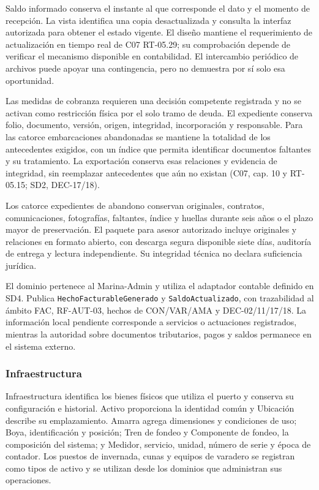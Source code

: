 Saldo informado conserva el instante al que corresponde el dato y el momento de recepción. La vista identifica una copia desactualizada y consulta la interfaz autorizada para obtener el estado vigente. El diseño mantiene el requerimiento de actualización en tiempo real de C07 RT-05.29; su comprobación depende de verificar el mecanismo disponible en contabilidad. El intercambio periódico de archivos puede apoyar una contingencia, pero no demuestra por sí solo esa oportunidad.

Las medidas de cobranza requieren una decisión competente registrada y no se activan como restricción física por el solo tramo de deuda. El expediente conserva folio, documento, versión, origen, integridad, incorporación y responsable. Para las catorce embarcaciones abandonadas se mantiene la totalidad de los antecedentes exigidos, con un índice que permita identificar documentos faltantes y su tratamiento. La exportación conserva esas relaciones y evidencia de integridad, sin reemplazar antecedentes que aún no existan (C07, cap. 10 y RT-05.15; SD2, DEC-17/18).

Los catorce expedientes de abandono conservan originales, contratos, comunicaciones, fotografías, faltantes, índice y huellas durante seis años o el plazo mayor de preservación. El paquete para asesor autorizado incluye originales y relaciones en formato abierto, con descarga segura disponible siete días, auditoría de entrega y lectura independiente. Su integridad técnica no declara suficiencia jurídica.

El dominio pertenece al Marina-Admin y utiliza el adaptador contable definido en SD4. Publica \texttt{HechoFacturableGenerado} y \texttt{SaldoActualizado}, con trazabilidad al ámbito FAC, RF-AUT-03, hechos de CON/VAR/AMA y DEC-02/11/17/18. La información local pendiente corresponde a servicios o actuaciones registrados, mientras la autoridad sobre documentos tributarios, pagos y saldos permanece en el sistema externo.


\subsubsection{Infraestructura}
Infraestructura identifica los bienes físicos que utiliza el puerto y conserva su configuración e historial. Activo proporciona la identidad común y Ubicación describe su emplazamiento. Amarra agrega dimensiones y condiciones de uso; Boya, identificación y posición; Tren de fondeo y Componente de fondeo, la composición del sistema; y Medidor, servicio, unidad, número de serie y época de contador. Los puestos de invernada, cunas y equipos de varadero se registran como tipos de activo y se utilizan desde los dominios que administran sus operaciones.

